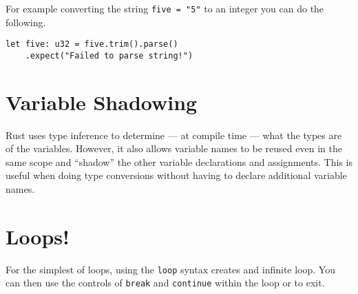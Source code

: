 \documentclass[12pt,notitlepage]{article}
\begin{document}
For example converting the string \lstinline{five = "5"} to an integer you can
do the following.

\begin{lstlisting}
let five: u32 = five.trim().parse()
    .expect("Failed to parse string!")
\end{lstlisting}

\section{Variable Shadowing}

Rust uses type inference to determine --- at compile time --- what the types
are of the variables. However, it also allows variable names to be reused even
in the same scope and ``shadow'' the other variable declarations and
assignments. This is useful when doing type conversions without having to
declare additional variable names.



\section{Loops!}

For the simplest of loops, using the \lstinline{loop} syntax creates and
infinite loop. You can then use the controls of \lstinline{break} and
\lstinline{continue} within the loop or to exit.
\end{document}
